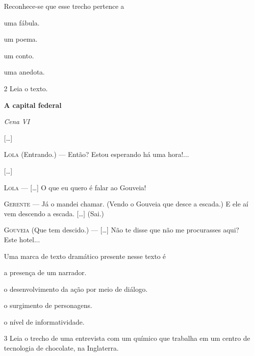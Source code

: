 Reconhece-se que esse trecho pertence a

\begin{escolha}
\item uma fábula.

\item um poema.

\item um conto.

\item uma anedota.
\end{escolha}

\pagebreak
\num{2} Leia o texto.

\begin{myquote}
\textbf{A capital federal}

\textit{Cena VI}

{[}\ldots{}{]}

\textsc{Lola} (Entrando.) --- Então? Estou esperando há uma hora!...

{[}\ldots{}{]}

\textsc{Lola} --- {[}\ldots{}{]} O que eu quero é falar ao Gouveia!

\textsc{Gerente} --- Já o mandei chamar. (Vendo o Gouveia que desce a escada.)
E ele aí vem descendo a escada. {[}\ldots{}{]} (Sai.)

\textsc{Gouveia} (Que tem descido.) --- {[}\ldots{}{]} Não te disse que não me
procurasses aqui? Este hotel...

\end{myquote}

Uma marca de texto dramático presente nesse texto é

\begin{escolha}
\item a presença de um narrador.

\item o desenvolvimento da ação por meio de diálogo.

\item o surgimento de personagens.

\item o nível de informatividade.
\end{escolha}

\num{3} Leia o trecho de uma entrevista com um químico que
trabalha em um centro de tecnologia de chocolate, na Inglaterra.

